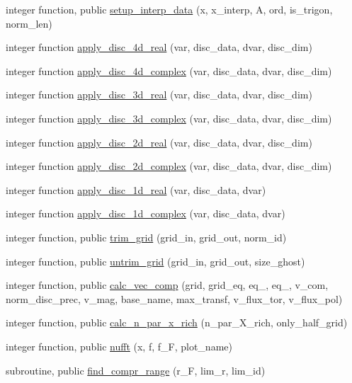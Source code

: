 \begin{DoxyCompactItemize}
\item 
integer function, public \hyperlink{namespacegrid__utilities_a43206328f85253a6cc821cd46a498bb6}{setup\+\_\+interp\+\_\+data} (x, x\+\_\+interp, A, ord, is\+\_\+trigon, norm\+\_\+len)
\item 
integer function \hyperlink{namespacegrid__utilities_a9494e086550e67e6d1319d94d37e15ef}{apply\+\_\+disc\+\_\+4d\+\_\+real} (var, disc\+\_\+data, dvar, disc\+\_\+dim)
\item 
integer function \hyperlink{namespacegrid__utilities_a7fcde4b046076294fc8d2ca130f84add}{apply\+\_\+disc\+\_\+4d\+\_\+complex} (var, disc\+\_\+data, dvar, disc\+\_\+dim)
\item 
integer function \hyperlink{namespacegrid__utilities_a876f338471e643a680893b9a19715016}{apply\+\_\+disc\+\_\+3d\+\_\+real} (var, disc\+\_\+data, dvar, disc\+\_\+dim)
\item 
integer function \hyperlink{namespacegrid__utilities_a2e42ad0b765c9292bc7010069359cc28}{apply\+\_\+disc\+\_\+3d\+\_\+complex} (var, disc\+\_\+data, dvar, disc\+\_\+dim)
\item 
integer function \hyperlink{namespacegrid__utilities_a9ffa0404a239305f4c0c577d1e34a791}{apply\+\_\+disc\+\_\+2d\+\_\+real} (var, disc\+\_\+data, dvar, disc\+\_\+dim)
\item 
integer function \hyperlink{namespacegrid__utilities_a7cb36e1ff9abd22f7f18d8b65215c67f}{apply\+\_\+disc\+\_\+2d\+\_\+complex} (var, disc\+\_\+data, dvar, disc\+\_\+dim)
\item 
integer function \hyperlink{namespacegrid__utilities_ae57cbda514cf4bf01714e0746ff342a2}{apply\+\_\+disc\+\_\+1d\+\_\+real} (var, disc\+\_\+data, dvar)
\item 
integer function \hyperlink{namespacegrid__utilities_a948a0ef995a14a7a80464933e8c28029}{apply\+\_\+disc\+\_\+1d\+\_\+complex} (var, disc\+\_\+data, dvar)
\item 
integer function, public \hyperlink{namespacegrid__utilities_a67001ff9bbcad707aacf17f90a748d90}{trim\+\_\+grid} (grid\+\_\+in, grid\+\_\+out, norm\+\_\+id)
\item 
integer function, public \hyperlink{namespacegrid__utilities_a4679f24af8e02793070f4e27b43e00b6}{untrim\+\_\+grid} (grid\+\_\+in, grid\+\_\+out, size\+\_\+ghost)
\item 
integer function, public \hyperlink{namespacegrid__utilities_a3076796477d38ffed189868b3b28efb1}{calc\+\_\+vec\+\_\+comp} (grid, grid\+\_\+eq, eq\+\_, eq\+\_, v\+\_\+com, norm\+\_\+disc\+\_\+prec, v\+\_\+mag, base\+\_\+name, max\+\_\+transf, v\+\_\+flux\+\_\+tor, v\+\_\+flux\+\_\+pol)
\item 
integer function, public \hyperlink{namespacegrid__utilities_adeb8c22db4d419a278d6fcc68a34100c}{calc\+\_\+n\+\_\+par\+\_\+x\+\_\+rich} (n\+\_\+par\+\_\+\+X\+\_\+rich, only\+\_\+half\+\_\+grid)
\item 
integer function, public \hyperlink{namespacegrid__utilities_a0854b2d6cc61a31f68b4afe7304077a9}{nufft} (x, f, f\+\_\+F, plot\+\_\+name)
\item 
subroutine, public \hyperlink{namespacegrid__utilities_ae08e1ff213071c9d411a9b9c76035e1e}{find\+\_\+compr\+\_\+range} (r\+\_\+F, lim\+\_\+r, lim\+\_\+id)
\end{DoxyCompactItemize}
